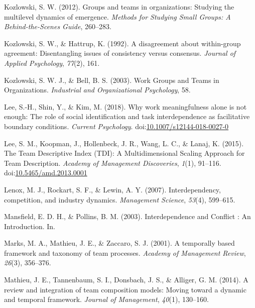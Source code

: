 \documentclass[english,,man]{apa6}
\theoremstyle{definition}
\theoremstyle{definition}
\theoremstyle{definition}
\theoremstyle{remark}
\begin{document}
\leavevmode\hypertarget{ref-kozlowski_groups_2012}{}%
Kozlowski, S. W. (2012). Groups and teams in organizations: Studying the
multilevel dynamics of emergence. \emph{Methods for Studying Small
Groups: A Behind-the-Scenes Guide}, 260--283.

\leavevmode\hypertarget{ref-kozlowski1992disagreement}{}%
Kozlowski, S. W., \& Hattrup, K. (1992). A disagreement about
within-group agreement: Disentangling issues of consistency versus
consensus. \emph{Journal of Applied Psychology}, \emph{77}(2), 161.

\leavevmode\hypertarget{ref-kozlowski_work_nodate}{}%
Kozlowski, S. W. J., \& Bell, B. S. (2003). Work Groups and Teams in
Organizations. \emph{Industrial and Organizational Psychology}, 58.

\leavevmode\hypertarget{ref-lee_why_2018}{}%
Lee, S.-H., Shin, Y., \& Kim, M. (2018). Why work meaningfulness alone
is not enough: The role of social identification and task
interdependence as facilitative boundary conditions. \emph{Current
Psychology}.
doi:\href{https://doi.org/10.1007/s12144-018-0027-0}{10.1007/s12144-018-0027-0}

\leavevmode\hypertarget{ref-lee_team_2015}{}%
Lee, S. M., Koopman, J., Hollenbeck, J. R., Wang, L. C., \& Lanaj, K.
(2015). The Team Descriptive Index (TDI): A Multidimensional Scaling
Approach for Team Description. \emph{Academy of Management Discoveries},
\emph{1}(1), 91--116.
doi:\href{https://doi.org/10.5465/amd.2013.0001}{10.5465/amd.2013.0001}

\leavevmode\hypertarget{ref-lenox_interdependency_2007}{}%
Lenox, M. J., Rockart, S. F., \& Lewin, A. Y. (2007). Interdependency,
competition, and industry dynamics. \emph{Management Science},
\emph{53}(4), 599--615.

\leavevmode\hypertarget{ref-mansfield_interdependence_2003}{}%
Mansfield, E. D. H., \& Pollins, B. M. (2003). Interdependence and
Conflict : An Introduction. In.

\leavevmode\hypertarget{ref-marks_temporally_2001}{}%
Marks, M. A., Mathieu, J. E., \& Zaccaro, S. J. (2001). A temporally
based framework and taxonomy of team processes. \emph{Academy of
Management Review}, \emph{26}(3), 356--376.

\leavevmode\hypertarget{ref-mathieu_review_2014}{}%
Mathieu, J. E., Tannenbaum, S. I., Donsbach, J. S., \& Alliger, G. M.
(2014). A review and integration of team composition models: Moving
toward a dynamic and temporal framework. \emph{Journal of Management},
\emph{40}(1), 130--160.
\end{document}
